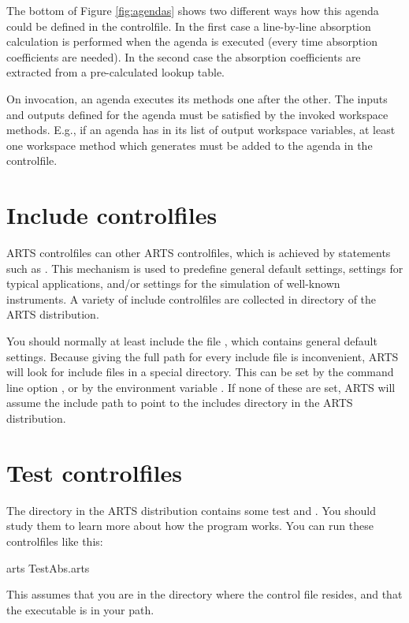 The bottom of Figure \ref{fig:agendas} shows two different ways how this agenda
could be defined in the controlfile. In the first case a line-by-line
absorption calculation is performed when the agenda is executed (every time
absorption coefficients are needed). In the second case the absorption
coefficients are extracted from a pre-calculated lookup table.

On invocation, an agenda executes its methods one after the
other. The inputs and outputs defined for the agenda must be satisfied
by the invoked workspace methods. E.g., if an agenda has
 in its list of output workspace
variables, at least one workspace method which generates
 must be added to the agenda in the
controlfile.

\section{Include controlfiles}

ARTS controlfiles can \emph{} other ARTS
controlfiles, which is achieved by statements such as
.  This mechanism is used to
predefine general default settings, settings for typical applications,
and/or settings for the simulation of well-known instruments.  A
variety of include controlfiles are collected in directory
 of the ARTS distribution.

You should normally at least include the file
, which contains general default
settings. Because giving the full path for every include file is
inconvenient, ARTS will look for include files in a special
directory.  This can be set by the command line option , or by the environment variable
.  If none of these are set, ARTS will
assume the include path to point to the includes directory in the ARTS
distribution.

\section{Test controlfiles}

The directory  in the ARTS distribution contains some
test and .  You should study them to learn more about how
the program works. You can run these controlfiles like this:
\begin{code}
  arts TestAbs.arts
\end{code}
This assumes that you are in the directory where the control
file resides, and that the  executable is in
your path. 

